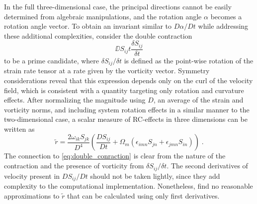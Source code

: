 \documentclass[11pt]{article}
\begin{document}
In the full three-dimensional case, the principal directions cannot be easily determined from algebraic manipulations, and the rotation angle $\alpha$ becomes a rotation angle vector. To obtain an invariant similar to $D \alpha / D t$ while addressing these additional complexities, \citet{spalart1997} consider the double contraction 
\begin{equation}
\DD{S_{ij}}{t} \frac{\delta S_{ij}}{\delta t}
\label{eq:double_conraction}
\end{equation}
to be a prime candidate, where $\delta S_{ij} / \delta t$ is defined as the point-wise rotation of the strain rate tensor at a rate given by the vorticity vector. Symmetry considerations reveal that this expression depends only on the curl of the velocity field, which is consistent with a quantity targeting only rotation and curvature effects. After normalizing the magnitude using $D$, an average of the strain and vorticity norms, and including system rotation effects in a similar manner to the two-dimensional case, a scalar measure of RC-effects in three dimensions can be written as
\begin{equation}
\tilde{r} = \frac{2 \omega_{ik} S_{jk}}{D^4}
\left( \frac{D S_{ij}}{D t} + \Omega_m (\epsilon_{imn} S_{jn} + \epsilon_{jmn} S_{in}) \right)
\;.
\end{equation}
The connection to \eqref{eq:double_conraction} is clear from the nature of the contraction and the presence of vorticity from $\delta S_{ij} / \delta t$. The second derivatives of velocity present in $D S_{ij} / D t$ should not be taken lightly, since they add complexity to the computational implementation. Nonetheless, \citet{spalart1997} find no reasonable approximations to $\tilde{r}$ that can be calculated using only first derivatives.
\end{document}
